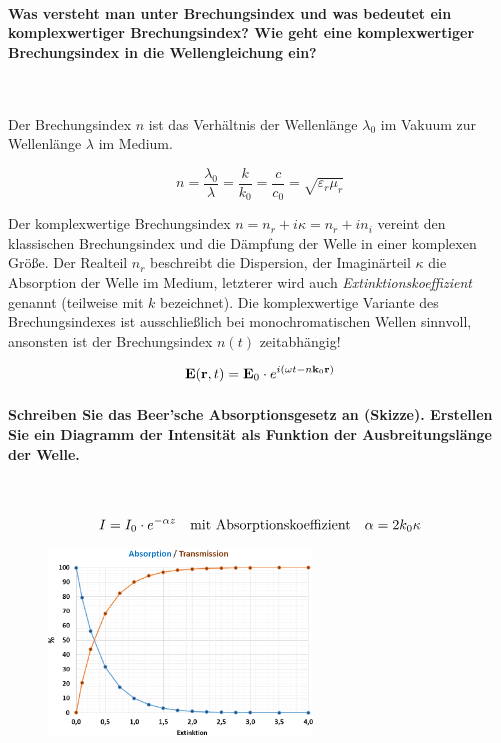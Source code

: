 \documentclass[a4paper, 11pt, ngerman, parskip=half-]{scrartcl}
\begin{document}
\paragraph{Was versteht man unter Brechungsindex und was bedeutet ein komplexwertiger
    Brechungsindex? Wie geht eine komplexwertiger Brechungsindex in die Wellengleichung ein?} ~

Der Brechungsindex $n$ ist das Verhältnis der Wellenlänge $\lambda_0$ im Vakuum zur Wellenlänge
$\lambda$ im Medium.

\begin{equation}
    n = \frac{\lambda_0}{\lambda} = \frac{k}{k_0} = \frac{c}{c_0} = \sqrt{\varepsilon_r \mu_r}
\end{equation}

Der komplexwertige Brechungsindex $n = n_r + i \kappa = n_r + i n_i$ vereint den klassischen
Brechungsindex und die Dämpfung der Welle in einer komplexen Größe. Der Realteil $n_r$ beschreibt die
Dispersion, der Imaginärteil $\kappa$ die Absorption der Welle im Medium, letzterer wird auch \textit{Extinktionskoeffizient}
genannt (teilweise mit $k$ bezeichnet). Die komplexwertige Variante des Brechungsindexes ist ausschließlich bei
monochromatischen Wellen sinnvoll, ansonsten ist der Brechungsindex $n(t)$ zeitabhängig!

\begin{equation}
    \vb{E}(\vb{r},t) = \vb{E}_0 \cdot e^{i(\omega t - n \vb{k}_0 \vb{r})}
\end{equation}

\paragraph{Schreiben Sie das Beer'sche Absorptionsgesetz an (Skizze). Erstellen Sie ein Diagramm der
    Intensität als Funktion der Ausbreitungslänge der Welle.} ~

\begin{equation}
    I = I_0 \cdot e^{- \alpha z} \qq{mit Absorptionskoeffizient} \alpha = 2 k_0 \kappa
\end{equation}

\begin{figure}[H]
    \centering
    \includegraphics[width=7cm]{image/14/5}
\end{figure}
\end{document}
